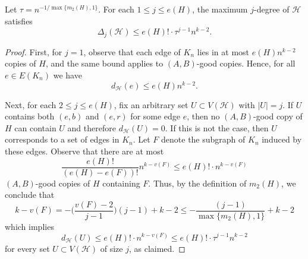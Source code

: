 \documentclass[10pt,a4paper]{amsart}
\newcommand\cH{\mathcal{H}}
\renewcommand\leq{\leqslant}
\renewcommand\le{\leqslant}
\begin{document}
\begin{lemma}\label{lem:degreecondition}
Let $\tau=n^{-1/\max\{m_2(H),1\}}$. For each $1\leq j\leq e(H)$, the maximum $j$-degree of $\cH$ satisfies
\[\Delta_j(\cH)\leq e(H)!\cdot\tau^{j-1} n^{k-2}. \]
\end{lemma}

\begin{proof}
First, for $j=1$, observe that each edge of $K_n$ lies in at most $e(H) n^{k-2}$ copies of $H$, 
and the same bound applies to $(A,B)$-good copies. Hence, for all $e \in E(K_n)$ we have
\[d_{\cH}(e) \leq e(H) n^{k-2}.\]

Next, for each $2\leq j\leq e(H)$, fix an arbitrary set $U\subset V(\cH)$ with $|U|=j$. 
If $U$ contains both $(e,b)$ and $(e,r)$ for some edge $e$, then no $(A,B)$-good copy of $H$ can contain $U$ and therefore $d_{\cH}(U)=0$. If this is not the case, then $U$ corresponds to a set of edges in $K_n$. 
Let $F$ denote the subgraph of $K_n$ induced by these edges. Observe that there are at most 
\[\frac{e(H)!}{(e(H)-e(F))!} n^{k-v(F)} \le e(H)!\cdot n^{k-v(F)}\] $(A,B)$-good copies of $H$ containing $F$. Thus, by the definition of $m_2(H)$, we conclude that
\[k-v(F)=-\bigg(\frac{v(F)-2}{j-1}\bigg)(j-1)+k-2\le-\frac{(j-1)}{\max\{m_2(H),1\}}+k-2\]
which implies
\begin{equation*}
    d_{\cH}(U) \leq e(H)!\cdot n^{k-v(F)} \leq e(H)!\cdot\tau^{j-1} n^{k-2}
\end{equation*}
for every set $U\subset V(\cH)$ of size $j$, as claimed.
\end{proof}
\end{document}
